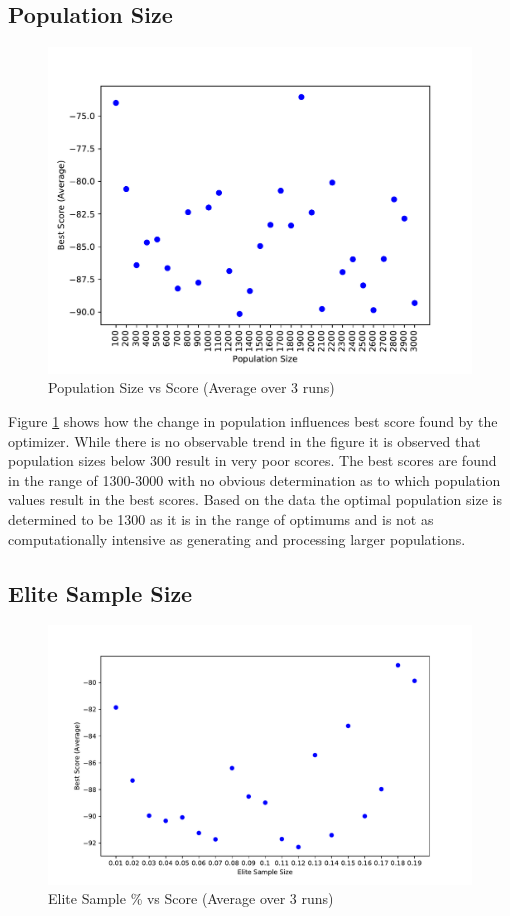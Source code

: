 \documentclass[conference,letterpaper]{IEEEtran}
\begin{document}
\subsection{Population Size}
\begin{figure}[H]
    \includegraphics[scale=0.50]{CE_population}
    \caption{Population Size vs Score (Average over 3 runs)}
    \label{ce population}
\end{figure}
\par Figure \ref{ce population} shows how the change in population influences best score found by the optimizer. While there is no observable trend in the figure it is observed that population sizes below 300 result in very poor scores. The best scores are found in the range of 1300-3000 with no obvious determination as to which population values result in the best scores. Based on the data the optimal population size is determined to be 1300 as it is in the range of optimums and is not as computationally intensive as generating and processing larger populations.

\subsection{Elite Sample Size}
\begin{figure}[H]
    \includegraphics[scale=0.38]{CE_elitesample}
    \caption{Elite Sample \% vs Score (Average over 3 runs)}
    \label{ce elitesample}
\end{figure}
\end{document}
